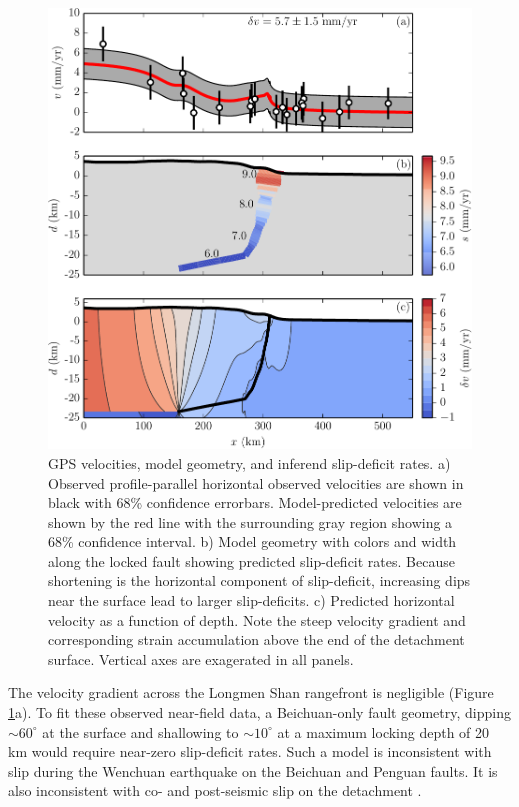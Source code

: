 \documentclass[12pt]{article}
\begin{document}
\begin{figure}[h!]
    \centering
    \includegraphics{figs/stack_figure_all_details.pdf}
    \caption{GPS velocities, model geometry, and inferend slip-deficit rates. a) Observed profile-parallel horizontal observed velocities are shown in black with 68\% confidence errorbars. Model-predicted velocities are shown by the red line with the surrounding gray region showing a 68\% confidence interval. b) Model geometry with colors and width along the locked fault showing predicted slip-deficit rates. Because shortening is the horizontal component of slip-deficit, increasing dips near the surface lead to larger slip-deficits. c) Predicted horizontal velocity as a function of depth. Note the steep velocity gradient and corresponding strain accumulation above the end of the detachment surface. Vertical axes are exagerated in all panels.}
    \label{fig:big_stack}
\end{figure}

The velocity gradient across the Longmen Shan rangefront is negligible (Figure \ref{fig:big_stack}a). To fit these observed near-field data, a Beichuan-only fault geometry, dipping ${\sim}60^{\circ}$ at the surface and shallowing to ${\sim}10^{\circ}$ at a maximum locking depth of 20 km would require near-zero slip-deficit rates. Such a model is inconsistent with slip during the Wenchuan earthquake on the Beichuan and Penguan faults. It is also inconsistent with co- and post-seismic slip on the detachment \citep{Qi2011, Fielding2013b}.
\end{document}
